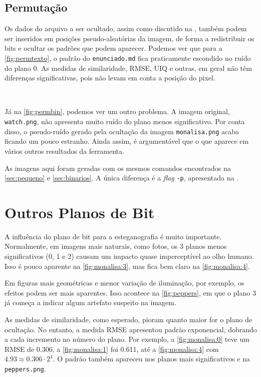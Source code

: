 \subsection{Permutação}

    Os dados do arquivo a ser ocultado, assim como discutido na , também podem ser inseridos em posições pseudo-aleatórias da imagem, de forma a redistribuir os bits e ocultar os padrões que podem aparecer. Podemos ver que para a \cref{fig:permtexto}, o padrão do \texttt{enunciado.md} fica praticamente escondido no ruído do plano 0. As medidas de similaridade, RMSE, UIQ e outras, em geral não têm diferenças significativas, pois não levam em conta a posição do pixel.

    ~

    

    Já na \cref{fig:permbin}, podemos ver um outro problema. A imagem original, \texttt{watch.png}, não apresenta muito ruído do plano menos significativo. Por conta disso, o pseudo-ruído gerado pela ocultação da imagem \texttt{monalisa.png} acaba ficando um pouco estranho. Ainda assim, é argumentável que o que aparece em vários outros resultados da ferramenta.

    As imagens aqui foram geradas com os mesmos comandos encontrados na \cref{sec:pequeno} e \cref{sec:binarios}. A única diferença é a \textit{flag} \texttt{-p}, apresentada na .

    

\section{Outros Planos de Bit}

    A influência do plano de bit para a esteganografia é muito importante. Normalmente, em imagens mais naturais, como fotos, os 3 planos menos significativos (0, 1 e 2) causam um impacto quase imperceptível ao olho humano. Isso é pouco aparente na \cref{fig:monalisa:3}, mas fica bem claro na \cref{fig:monalisa:4}.

    

    Em figuras mais geométricas e menor variação de iluminação, por exemplo, os efeitos podem ser mais aparentes. Isso acontece na \cref{fig:peppers}, em que o plano 3 já começa a indicar algum artefato suspeito na imagem.

    As medidas de similaridade, como esperado, pioram quanto maior for o plano de ocultação. No entanto, a medida RMSE apresentou padrão exponencial, dobrando a cada incremento no número do plano. Por exemplo, a \cref{fig:monalisa:0} teve um RMSE de 0.306, a \cref{fig:monalisa:1} foi 0.611, até a \cref{fig:monalisa:4} com $4.93 \approx 0.306 \cdot 2^4$. O padrão também apareceu nos planos mais significativos e na \texttt{peppers.png}.

    
